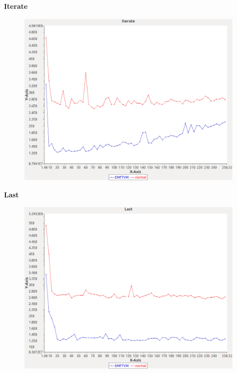 \noindent\textbf{Iterate}

\begin{figure}[h]
\centering
\includegraphics[width=\textwidth]{../graphs/orderedset/Iterate}
\end{figure}
\pagebreak

\noindent\textbf{Last}

\begin{figure}[h]
\centering
\includegraphics[width=\textwidth]{../graphs/orderedset/Last}
\end{figure}
\pagebreak

